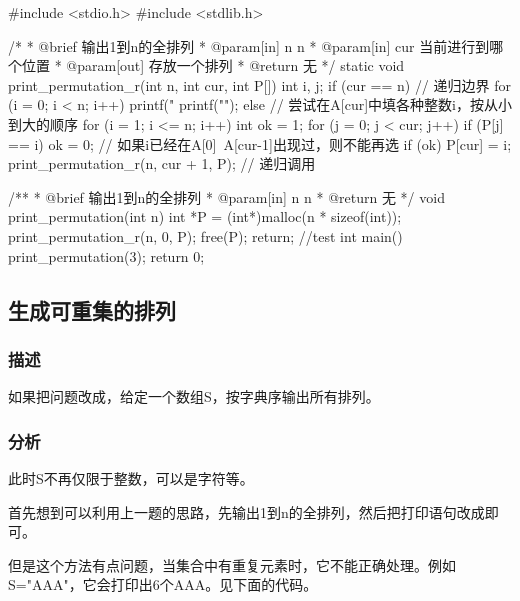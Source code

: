 \begin{Codex}[label=print_permutation_n.c]
#include <stdio.h>
#include <stdlib.h>

/*
 * @brief 输出1到n的全排列
 * @param[in] n n
 * @param[in] cur 当前进行到哪个位置
 * @param[out] 存放一个排列
 * @return 无
 */
static void print_permutation_r(int n, int cur, int P[]) {
    int i, j;
    if (cur == n) { // 递归边界
        for (i = 0; i < n; i++)
            printf("%
        printf("\n");
    } else {
        // 尝试在A[cur]中填各种整数i，按从小到大的顺序
        for (i = 1; i <= n; i++) {
            int ok = 1;
            for (j = 0; j < cur; j++)
                if (P[j] == i)
                    ok = 0; // 如果i已经在A[0]~A[cur-1]出现过，则不能再选
            if (ok) {
                P[cur] = i;
                print_permutation_r(n, cur + 1, P); // 递归调用
            }
        }
    }
}

/**
 * @brief 输出1到n的全排列
 * @param[in] n n
 * @return 无
 */
void print_permutation(int n) {
    int *P = (int*)malloc(n * sizeof(int));
    print_permutation_r(n, 0, P);
    free(P);
    return;
}
//test
int main() {
    print_permutation(3);
    return 0;
}
\end{Codex}


\subsection{生成可重集的排列}

\subsubsection{描述}
如果把问题改成，给定一个数组S，按字典序输出所有排列。

\subsubsection{分析}
此时S不再仅限于整数，可以是字符等。

首先想到可以利用上一题的思路，先输出1到n的全排列，然后把打印语句改成即可。

但是这个方法有点问题，当集合中有重复元素时，它不能正确处理。例如S="AAA"，它会打印出6个AAA。见下面的代码。

